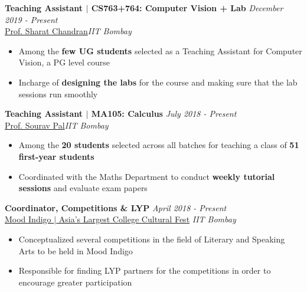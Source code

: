 \documentclass[10pt]{article}
\begin{document}
\vspace*{-3pt}
\textbf{\large Teaching Assistant $|$ CS763+764: Computer Vision + Lab} \hfill{\sl \small December 2019 - Present}\\
 \href{http://www.math.iitb.ac.in/~sourav/}{ Prof. Sharat Chandran}\hfill{\sl \small IIT Bombay}\\
\vspace{-18pt}
\begin{itemize}[itemsep = -0.75 mm, leftmargin=*]
\item Among the \textbf{few UG students} selected as a Teaching Assistant for Computer Vision, a PG level course
\item Incharge of \textbf{designing the labs} for the course and making sure that the lab sessions run smoothly
\end{itemize}
\textbf{\large Teaching Assistant $|$ MA105: Calculus} \hfill{\sl \small July 2018 - Present}\\
 \href{https://sites.google.com/view/pal-sourav/home}{ Prof. Sourav Pal}\hfill{\sl \small IIT Bombay}\\
\vspace{-18pt}
\begin{itemize}[itemsep = -0.75 mm, leftmargin=*]
\item Among the {\bf 20 students} selected across all batches for teaching a class of {\bf 51 first-year students}
\item Coordinated with the Maths Department to conduct {\bf weekly tutorial sessions} and evaluate exam papers
\end{itemize}
\vspace{2pt}
\textbf{\large Coordinator, Competitions \& LYP } \hfill{\sl \small April 2018 - Present}\\
\href{https://en.wikipedia.org/wiki/Mood_Indigo_(festival)}{ Mood Indigo $|$ Asia's Largest College Cultural Fest} \hfill{\sl \small IIT Bombay}\\
\vspace{-18pt}
\begin{itemize}[itemsep = -0.75 mm, leftmargin=*]
\item Conceptualized several competitions in the field of  Literary and Speaking Arts to be held in Mood Indigo
\item Responsible for finding LYP partners for the  competitions in order to encourage greater participation
\end{itemize}
\end{document}
